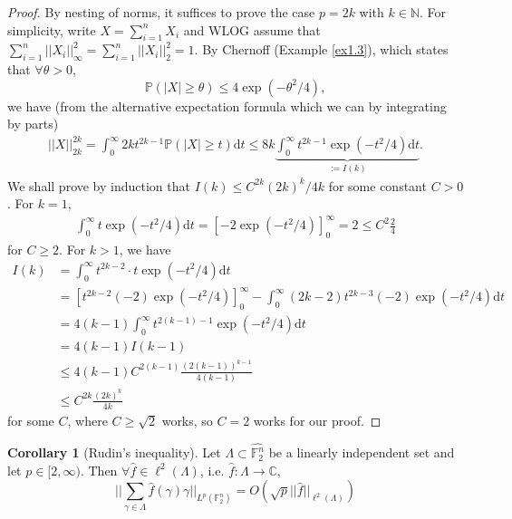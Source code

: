 \documentclass{article}
\theoremstyle{definition}
\newtheorem{cor}[theorem]{Corollary}
\begin{document}
\begin{proof}
    
    By nesting of norms, it suffices to prove the case $p = 2k$ with $k \in \mathbb{N}$. For simplicity, write $X = \sum_{i=1}^{n} X_i$ and WLOG assume that $\sum_{i=1}^{n} ||X_i||_{\infty}^2 = \sum_{i=1}^{n} ||X_i||_2^2 = 1$. By Chernoff (Example \ref{ex1.3}), which states that $\forall \theta >0$, \[
    \mathbb{P}\left(\left|X\right|\ge \theta\right) \le 4 \exp(-\theta^2/4),
    \]
    we have (from the alternative expectation formula which we can by integrating by parts)
    \begin{align*}
        ||X||_{2k}^{2k} = \int_{0}^{\infty} 2k t^{2k-1}\mathbb{P}\left(\left|X\right|\ge t\right)\mathrm{d}t \le 8k \underbrace{\int_{0}^{\infty} t^{2k-1}\exp(-t^2/4)\mathrm{d}t}_{:=I(k)}.
    \end{align*}
    We shall prove by induction that $I(k) \le C^{2k}(2k)^k/4k$ for some constant $C>0$. For $k=1$, 
    \begin{align*}
        \int_{0}^{\infty} t \exp \left(-t^2/4\right) \mathrm{d}t = [-2\exp \left(-t^2/4\right)]_0^{\infty} = 2 \le C^2\frac{2}{4} 
    \end{align*}
    for $C \ge 2$. For $k>1$, we have 
    \begin{align*}
        I(k) &= \int_{0}^{\infty}  t^{2k-2} \cdot t \exp \left(-t^2/4\right) \mathrm{d}t \\
        &= [t^{2k-2}(-2)\exp \left(-t^2/4\right)]_0^\infty - \int_{0}^{\infty} (2k-2)t^{2k-3}(-2)\exp \left(-t^2/4 \right)\mathrm{d}t \\
        &= 4(k-1)\int_{0}^{\infty} t^{2(k-1)-1} \exp(-t^2/4)\mathrm{d}t \\
        &= 4(k-1)I(k-1) \\
        &\le 4(k-1) C^{2(k-1)}\frac{(2(k-1))^{k-1}}{4(k-1)} \\
        &\le C^{2k}\frac{(2k)^k}{4k}
    \end{align*}
    for some $C$, where $C\ge \sqrt{2}$ works, so $C=2$ works for our proof.
\end{proof}
\begin{cor}[Rudin's inequality]\label{cor3.2}
    Let $\Lambda \subset \widehat{\mathbb{F}_2^n}$ be a linearly independent set and let $p \in [2,\infty)$. Then $\forall \widehat{f} \in \ell^2(\Lambda)$, i.e. $\widehat{f} : \Lambda \to \mathbb{C}$,
    \[
    ||\sum_{\gamma \in \Lambda}^{} \widehat{f}(\gamma)\gamma ||_{L^p(\mathbb{F}_2^n)} = O \left(\sqrt{p} ||\widehat{f}||_{\ell^2(\Lambda)}\right)
    \]
\end{cor}
\end{document}
